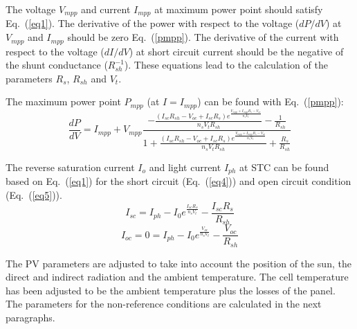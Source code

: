 The voltage $V_{mpp}$ and current $I_{mpp}$ at maximum power point should satisfy Eq.~(\ref{eq1}). The derivative of the power with respect to the voltage ($dP/dV$) at $V_{mpp}$ and $I_{mpp}$ should be zero Eq.~(\ref{pmpp}). The derivative of the current with respect to the voltage ($dI/dV$) at short circuit current should be the negative of the shunt conductance ($R_{sh}^{-1}$). These equations lead to the calculation of the parameters $R_{s}$, $R_{sh}$ and $V_{t}$.

The maximum power point $P_{mpp}$ (at $I = I_{mpp}$) can be found with Eq.~(\ref{pmpp}):
\begin{equation}
\frac{dP}{dV} = I_{mpp} + V_{mpp} \frac{-\frac{(I_{sc} R_{sh} - V_{oc} + I_{sc} R_{s}) e^{\frac{V_{mpp} + I_{mpp} R_{s} - V_{oc}}{n_{s} V_{t}}}}{n_{s} V_{t} R_{sh}} - \frac{1}{R_{sh}}}{1 + \frac{(I_{sc} R_{sh} - V_{oc} + I_{sc} R_{s}) e^{\frac{V_{mpp} + I_{mpp} R_{s} - V_{oc}}{n_{s} V_{t}}}}{n_{s} V_{t} R_{sh}} + \frac{R_{s}}{R_{sh}}}
\label{pmpp}
\end{equation}

The reverse saturation current $I_{o}$ and light current $I_{ph}$ at STC can be found based on Eq.~(\ref{eq1}) for the short circuit (Eq.~(\ref{eq4})) and open circuit condition (Eq.~(\ref{eq5})).
\begin{equation}
I_{sc} = I_{ph} - I_{0} e^{\frac{I_{sc} R_{s}}{n_{s} V_{t}}} - \frac{I_{sc} R_{s}}{R_{sh}}
\label{eq4}
\end{equation}
\begin{equation}
I_{oc} = 0 = I_{ph} - I_{0} e^{\frac{V_{oc}}{n_{s} V_{t}}} - \frac{V_{oc}}{R_{sh}}
\label{eq5}
\end{equation}

The PV parameters are adjusted to take into account the position of the sun, the direct and indirect radiation and the ambient temperature. The cell temperature has been adjusted to be the ambient temperature plus the losses of the panel. The parameters for the non-reference conditions are calculated in the next paragraphs.

